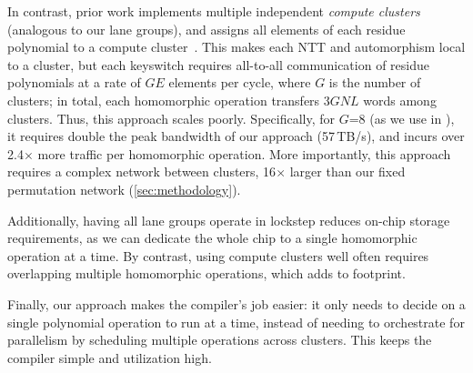 In contrast, prior work implements multiple independent \emph{compute clusters} (analogous to our lane groups),
and assigns all elements of each residue polynomial to a compute cluster~\cite{riazi:asplos20:heax,feldmann:micro21:f1}.
This makes each NTT and automorphism local to a cluster, but
each keyswitch requires all-to-all communication of residue polynomials at a rate of $GE$ elements per cycle,
where $G$ is the number of clusters;
in total, each homomorphic operation transfers $3GNL$ words among clusters.
Thus, this approach scales poorly.
Specifically, for $G$=8 (as we use in \name), it requires double the peak
bandwidth of our approach (57\,TB/s), and incurs over 2.4$\times$ more
traffic per homomorphic operation.
More importantly, this approach requires a complex network between clusters,
16$\times$ larger than our fixed permutation network (\autoref{sec:methodology}).

Additionally, having all lane groups operate in lockstep reduces on-chip storage requirements,
as we can dedicate the whole chip to a single homomorphic operation at a time.
By contrast, using compute clusters well often requires overlapping multiple homomorphic operations,
which adds to footprint.

Finally, our approach makes the compiler's job easier: it only needs to decide
on a single polynomial operation to run at a time, instead of needing to orchestrate
for parallelism by scheduling multiple operations across clusters. 
This keeps the compiler simple and utilization high.

